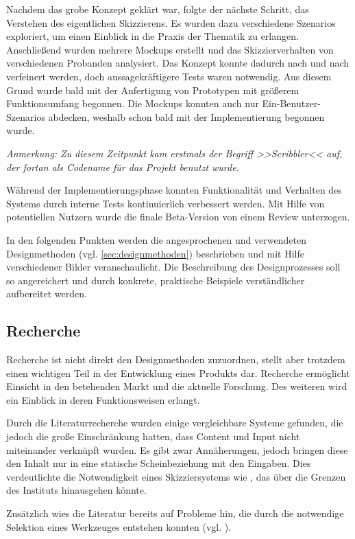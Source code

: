 Nachdem das grobe Konzept geklärt war, folgte der nächste Schritt, das Verstehen des eigentlichen Skizzierens. Es wurden dazu verschiedene Szenarios exploriert, um einen Einblick in die Praxis der Thematik zu erlangen. Anschließend wurden mehrere Mockups erstellt und das Skizzierverhalten von verschiedenen Probanden analysiert. Das Konzept konnte dadurch nach und nach verfeinert werden, doch aussagekräftigere Tests waren notwendig. Aus diesem Grund wurde bald mit der Anfertigung von Prototypen mit größerem Funktionsumfang begonnen. Die Mockups konnten auch nur Ein-Benutzer-Szenarios abdecken, weshalb schon bald mit der Implementierung begonnen wurde.

\bigskip \emph{Anmerkung: \graffito{\(\clubsuit\)} Zu diesem Zeitpunkt kam erstmals der Begriff >>Scribbler<< auf, der fortan als Codename für das Projekt benutzt wurde.}
\bigskip

Während der Implementierungsphase konnten Funktionalität und Verhalten des Systems durch interne Tests kontinuierlich verbessert werden. Mit Hilfe von potentiellen Nutzern wurde die finale Beta-Version von \scribbler einem Review unterzogen.

\medskip In den folgenden Punkten werden die angesprochenen und verwendeten Designmethoden (vgl. \autoref{sec:designmethoden}) beschrieben und mit Hilfe verschiedener Bilder veranschaulicht. Die Beschreibung des Designprozesses soll so angereichert und durch konkrete, praktische Beispiele verständlicher aufbereitet werden.

\subsection{Recherche}
Recherche ist nicht direkt den Designmethoden zuzuordnen, stellt aber trotzdem einen wichtigen Teil in der Entwicklung eines Produkts dar. Recherche ermöglicht Einsicht in den betehenden Markt und die aktuelle Forschung. Des weiteren wird ein Einblick in deren Funktionsweisen erlangt.

\medskip Durch die Literaturrecherche wurden einige vergleichbare Systeme gefunden, die jedoch die große Einschränkung hatten, dass Content und Input nicht miteinander verknüpft wurden. Es gibt zwar Annäherungen, jedoch bringen diese den Inhalt nur in eine statische Scheinbeziehung mit den Eingaben. Dies verdeutlichte die Notwendigkeit eines Skizziersystems wie \scribbler, das über die Grenzen des Instituts hinausgehen könnte.

Zusätzlich wies die Literatur bereits auf Probleme hin, die durch die notwendige Selektion eines Werkzeuges entstehen konnten (vgl. ).

